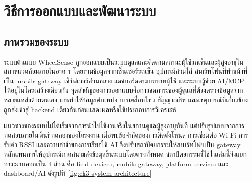 ﻿%
\chapter{วิธีการออกแบบและพัฒนาระบบ}
\label{chapter3}

\section{ภาพรวมของระบบ}
\label{sec:ch3_system_design}
ระบบต้นแบบ WheelSense ถูกออกแบบเป็นระบบดูแลและติดตามสถานะผู้ใช้รถเข็นและผู้สูงอายุในสภาพแวดล้อมภายในอาคาร โดยรวมข้อมูลจากเซ็นเซอร์รถเข็น อุปกรณ์สวมใส่ สมาร์ทโฟนที่ทำหน้าที่เป็น mobile gateway เซิร์ฟเวอร์ส่วนกลาง แดชบอร์ดตามบทบาทผู้ใช้ และระบบผู้ช่วย AI/MCP ให้อยู่ในโครงสร้างเดียวกัน จุดสำคัญของการออกแบบคือการลดภาระของผู้ดูแลที่ต้องตรวจข้อมูลจากหลายแหล่งด้วยตนเอง และทำให้ข้อมูลตำแหน่ง การเคลื่อนไหว สัญญาณชีพ และเหตุการณ์ที่เกี่ยวข้องถูกส่งเข้าสู่ backend เดียวกันก่อนแสดงผลหรือใช้ประกอบการวิเคราะห์

แนวทางของระบบไม่ได้เริ่มจากการนำไปใช้งานจริงในสถานดูแลผู้สูงอายุทันที แต่ปรับรูปแบบจากการทดสอบภายในพื้นที่ทดลองของโครงงาน เมื่อพบข้อจำกัดของการติดตั้งโหนด การเชื่อมต่อ Wi-Fi การรับค่า RSSI และความล่าช้าของการเรียกใช้ AI จึงปรับสถาปัตยกรรมให้สมาร์ทโฟนเป็น gateway หลักแทนการให้อุปกรณ์ภาคสนามส่งข้อมูลขึ้นระบบโดยตรงทั้งหมด สถาปัตยกรรมที่ใช้ในเล่มนี้จึงแยกภาระงานออกเป็น 4 ส่วน คือ field devices, mobile gateway, platform services และ dashboard/AI ดังรูปที่~\ref{fig:ch3-system-architecture}

